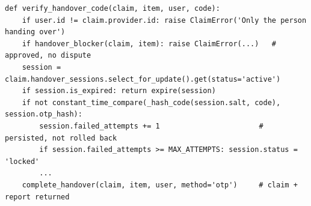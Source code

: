 \documentclass[12pt,a4paper,oneside]{report}
\newcommand{\code}[1]{\texttt{#1}}
\begin{document}
\begin{lstlisting}[style=lostlink,caption={Verifying a handover code (\code{claims/services.py}, abridged)}]
def verify_handover_code(claim, item, user, code):
    if user.id != claim.provider.id: raise ClaimError('Only the person handing over')
    if handover_blocker(claim, item): raise ClaimError(...)   # approved, no dispute
    session = claim.handover_sessions.select_for_update().get(status='active')
    if session.is_expired: return expire(session)
    if not constant_time_compare(_hash_code(session.salt, code), session.otp_hash):
        session.failed_attempts += 1                       # persisted, not rolled back
        if session.failed_attempts >= MAX_ATTEMPTS: session.status = 'locked'
        ...
    complete_handover(claim, item, user, method='otp')     # claim + report returned
\end{lstlisting}
\end{document}
